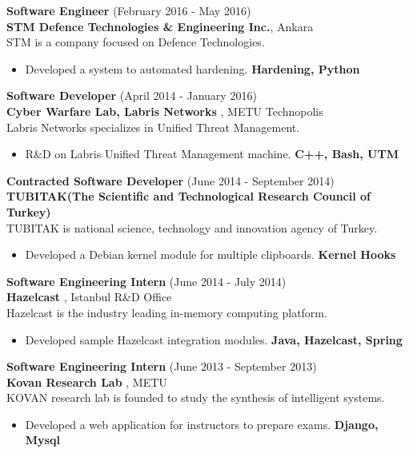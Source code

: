 \documentclass[margin, 10pt]{res} %
\begin{document}
\begin{resume}
        {\bf Software Engineer} \hfill (February 2016 - May 2016) \\
        {\bf STM Defence Technologies \& Engineering Inc.},  Ankara \\
        STM is a company focused on Defence Technologies.
        \begin{itemize}
            \item Developed a system to automated hardening.  {\bf Hardening, Python }
        \end{itemize}

        {\bf Software Developer} \hfill (April 2014 - January 2016) \\
        {\bf Cyber Warfare Lab, Labris Networks }, METU Technopolis \\
        Labris Networks specializes in Unified Threat Management.
        \begin{itemize}
            \item R\&D on Labris Unified Threat Management machine. {\bf C++, Bash, UTM  }
        \end{itemize}

        {\bf Contracted Software Developer} \hfill (June 2014 - September 2014) \\
        {\bf TUBITAK(The Scientific and Technological Research Council of Turkey) } \\
        TUBITAK is national science, technology and innovation agency of Turkey.
        \begin{itemize}
            \item Developed a Debian kernel module for multiple clipboards. {\bf Kernel Hooks }
        \end{itemize}

        {\bf Software Engineering Intern} \hfill (June 2014 - July 2014) \\
        {\bf Hazelcast }, Istanbul R\&D Office \\
        Hazelcast is the industry leading in-memory computing platform.
        \begin{itemize}
            \item Developed sample Hazelcast integration modules. {\bf Java, Hazelcast, Spring }
        \end{itemize}

        {\bf Software Engineering Intern} \hfill (June 2013 - September 2013) \\
        {\bf Kovan Research Lab }, METU \\
        KOVAN research lab is founded to study the synthesis of intelligent systems.
        \begin{itemize}
            \item Developed a web application for instructors to prepare exams. {\bf Django, Mysql }
        \end{itemize}




\end{resume}
\end{document}
